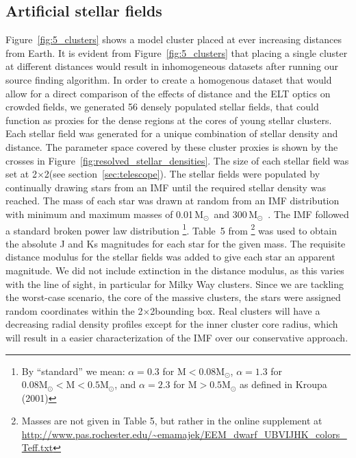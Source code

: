 \documentclass{aa}
\newcommand{\msun}{M$_\odot$~}
\begin{document}
\subsection{Artificial stellar fields}
  \label{subsec:stellar_fields}
Figure~\ref{fig:5_clusters} shows a model cluster placed at ever increasing distances from Earth.
It is evident from Figure~\ref{fig:5_clusters} that placing a single cluster at different distances would result in inhomogeneous datasets after running our source finding algorithm.
In order to create a homogenous dataset that would allow for a direct comparison of the effects of distance and the ELT optics on crowded fields, we generated 56 densely populated stellar fields, that could function as proxies for the dense regions at the cores of young stellar clusters.
Each stellar field was generated for a unique combination of stellar density and distance.
The parameter space covered by these cluster proxies is shown by the crosses in Figure~\ref{fig:resolved_stellar_densities}.
The size of each stellar field was set at 2\arcsec$\times$2\arcsec (see section~\ref{sec:telescope}).
The stellar fields were populated by continually drawing stars from an IMF until the required stellar density was reached.
The mass of each star was drawn at random from an IMF distribution with minimum and maximum masses of 0.01\,\msun and 300\,\msun.
The IMF followed a standard \citet{kroupa2001} broken power law distribution
\footnote{By ``standard'' we mean: $\alpha=0.3$ for $\mathrm{M} < 0.08 \mathrm{M}_\odot$, $\alpha=1.3$ for $0.08\mathrm{M}_\odot < \mathrm{M} < 0.5 \mathrm{M}_\odot$, and $\alpha=2.3$ for $\mathrm{M} > 0.5 \mathrm{M}_\odot$ as defined in Kroupa (2001)}.
Table~5 from \citet{pecaut2013}\footnote{Masses are not given in Table 5, but rather in the online supplement at \url{http://www.pas.rochester.edu/~emamajek/EEM_dwarf_UBVIJHK_colors_Teff.txt}}
was used to obtain the absolute J and Ks magnitudes for each star for the given mass.
The requisite distance modulus for the stellar fields was added to give each star an apparent magnitude.
We did not include extinction in the distance modulus, as this varies with the line of sight, in particular for Milky Way clusters.
Since we are tackling the worst-case scenario, the core of the massive clusters, the stars were assigned random coordinates within the 2\arcsec$\times$2\arcsec bounding box.
Real clusters will have a decreasing radial density profiles except for the inner cluster core radius, which will result in a easier characterization of the IMF over our conservative approach.
\end{document}
